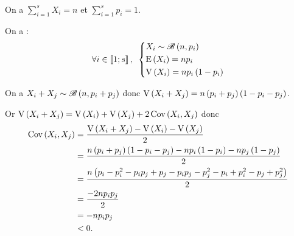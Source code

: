 \begin{corr}[1]~\\
On a \(\sum_{i=1}^sX_i=n\) et \(\sum_{i=1}^sp_i=1\).
\end{corr}

\begin{corr}[2]
On a : \[\quantifs{\forall i\in\interventierii{1}{s}}\begin{dcases}
X_i\sim\loibinomiale{n}{p_i} \\
\esp{X_i}=np_i \\
\vari{X_i}=np_i\paren{1-p_i}
\end{dcases}\]
\end{corr}

\begin{corr}[3]
On a \(X_i+X_j\sim\mathscr{B}\left(n,p_i+p_j\right)\) donc \(\operatorname{V}\left(X_i+X_j\right)=n\left(p_i+p_j\right)\left(1-p_i-p_j\right)\).

Or \(\operatorname{V}\left(X_i+X_j\right)=\operatorname{V}\left(X_i\right)+\operatorname{V}\left(X_j\right)+2\operatorname{Cov}\left(X_i,X_j\right)\) donc \[\begin{aligned}
\operatorname{Cov}\left(X_i,X_j\right)&=\dfrac{\operatorname{V}\left(X_i+X_j\right)-\operatorname{V}\left(X_i\right)-\operatorname{V}\left(X_j\right)}{2} \\
&=\dfrac{n\left(p_i+p_j\right)\left(1-p_i-p_j\right)-np_i\left(1-p_i\right)-np_j\left(1-p_j\right)}{2} \\
&=\dfrac{n\left(p_i-p_i^2-p_ip_j+p_j-p_ip_j-p_j^2-p_i+p_i^2-p_j+p_j^2\right)}{2} \\
&=\dfrac{-2np_ip_j}{2} \\
&=-np_ip_j \\
&<0.
\end{aligned}\]
\end{corr}


